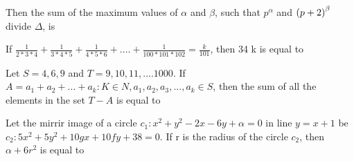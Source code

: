 Then the sum of the maximum values of $\alpha$ and $\beta$, such that $p^\alpha$ and $\left(p +2\right)^\beta$ divide $\Delta$, is 
\hfill{}
\item If $\frac{1}{2*3*4} + \frac{1}{3*4*5} + \frac{1}{4*5*6} +....+ \frac{1}{100*101*102} = \frac{k}{101}$, then 34 k is equal to
\hfill{}
\item Let $S = {4,6,9}$ and $T = {9,10,11,....1000}$. If $A = {a_1+a_2+...+a_k : K\in N, a_1,a_2,a_3,...,a_k \in S}$, then the sum of all the elements in the set $T - A$ is equal to 
\hfill{}
\item Let the mirrir image of a circle $c_1 : x^2 +y^2 - 2x - 6y +\alpha = 0$ in line $y = x + 1$ be $c_2 : 5x^2 + 5y^2 +10gx + 10fy + 38 =  0.$ If r is the radius of the circle $c_2$, then $\alpha + 6r^2$ is equal to
\hfill{}

